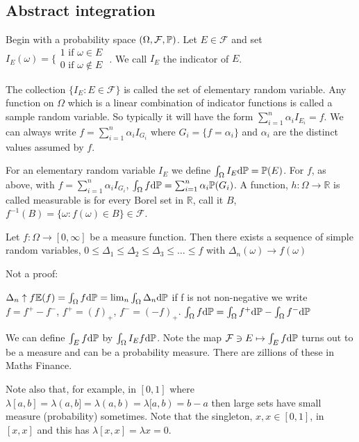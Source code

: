 \subsection{Abstract integration}

Begin with a probability space $(\Omega, \mathcal{F}, \mathbb{P})$. Let $E\in\mathcal{F}$ and set
$
I_E(\omega)=\bigg\{
\begin{matrix}
1 \text{ if }\omega\in E
\\
0 \text{ if }\omega\notin E
\end{matrix}
$ .
We call $I_E$ the indicator of $E$.

The collection $\{ I_E:E\in\mathcal{F} \}$ is called the set of elementary random variable. Any function on $\Omega$ which is a linear combination of indicator functions is called a sample random variable. So typically it will have the form $\sum_{i=1}^{n}\alpha_i I_{E_i}=f$. We can always write $f=\sum_{i=1}^n\alpha_i I_{G_i}$ where $G_i=\{ f=\alpha_i \}$ and $\alpha_i$ are the distinct values assumed by $f$.

For an elementary random variable $I_E$ we define $\int_\Omega I_{E} \text{d}\mathbb{P}=\mathbb{P}(E)$. For $f$, as above, with $f=\sum_{i=1}^n\alpha_i I_{G_i}$, $\int_\Omega f \text{d}\mathbb{P}=\sum_{i=1}^n\alpha_i\mathbb{P}(G_i)$. A function, $h:\Omega\rightarrow\mathbb{R}$ is called measurable is for every Borel set in $\mathbb{R}$, call it $B$, $f^{-1}(B)=\{\omega:f(\omega)\in B\}\in\mathcal{F}$.

Let $f:\Omega\rightarrow [0,\infty]$ be a measure function. Then there exists a sequence of simple random variables, $0\leq \Delta_1\leq\Delta_2\leq\Delta_3\leq\dots\leq f$ with $\Delta_n(\omega)\rightarrow f(\omega)$

Not a proof:

$\Delta_n\uparrow f\mathbb{E}(f)=\int_\Omega f\text{d}\mathbb{P}=\lim_n\int_\Omega\Delta_n\text{d}\mathbb{P}$ if f is not non-negative we write $f=f^+-f^-$, $f^+=(f)_+$, $f^-=(-f)_+$. $\int_\Omega f \text{d}\mathbb{P}=\int_\Omega f^+\text{d}\mathbb{P}-\int_\Omega f^-\text{d}\mathbb{P}$

We can define $\int_E f \text{d}\mathbb{P}$ by $\int_\Omega I_Ef\text{d}\mathbb{P}$. Note the map $\mathcal{F}\ni E\mapsto \int_E f \text{d}\mathbb{P}$ turns out to be a measure and can be a probability measure. There are zillions of these in Maths Finance.

Note also that, for example, in $[0,1]$ where $\lambda[a,b]=\lambda(a,b]=\lambda(a,b)=\lambda[a,b)=b-a$ then large sets have small measure (probability) sometimes. Note that the singleton, ${x},x\in[0,1]$, in $[x,x]$ and this has $\lambda[x,x]=\lambda{x}=0$.

